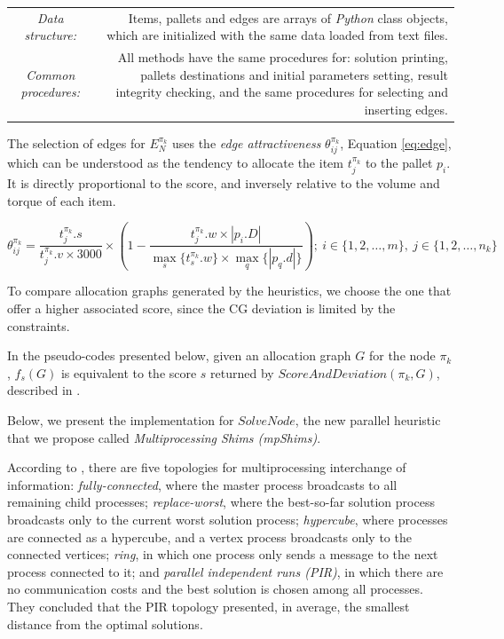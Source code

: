 \documentclass[preprint,authoryear]{elsarticle}
\begin{document}
\bgroup
\def\arraystretch{1.2}
\begin{table}[H]
	\centering
	\small
	\begin{tabular}{CD}
		
		{\it Data structure:}     & Items, pallets and edges are arrays of \emph{Python} class objects, which are initialized with the same data loaded from text files. \\
				
		{\it Common procedures:}  & All methods have the same procedures for: solution printing, pallets destinations and initial parameters setting, result integrity checking, and the same procedures for selecting and inserting edges.\\

	\end{tabular}
	\normalsize
\end{table}
\egroup

The selection of edges for $E_N^{\pi_k}$\/ uses the {\it edge attractiveness}\/ $\theta^{\pi_k}_{ij}$, Equation \ref{eq:edge}, which can be understood as the tendency to allocate the item $t^{\pi_k}_j$\/ to the pallet $p_i$. It is directly proportional to the score, and inversely relative to the volume and torque of each item. 

\begin{equation} \label{eq:edge}
	\theta^{\pi_k}_{ij}= \frac{t^{\pi_k}_j.s}{t^{\pi_k}_j.v \times 3000}\times(1-\frac{t^{\pi_k}_j.w\times|p_i.D|}{\max_s\{t^{\pi_k}_s.w\}\times\max_q\{|p_q.d|\}});\ i \in \{1,2,\ldots,m\},\ j \in \{1,2,\ldots,n_k\}
\end{equation} 

To compare allocation graphs generated by the heuristics, we choose the one that offer a higher associated score, since the CG deviation is limited by the constraints.

In the pseudo-codes presented below, given an allocation graph $G$\/ for the node $\pi_k$, $f_s(G)$\/ is equivalent to the score $s$\/ returned by $ScoreAndDeviation({\pi_k},G) $, described in \cite{MesquitaSanches2023}.

Below, we present the implementation for $SolveNode$, the new parallel heuristic that we propose called {\it Multiprocessing Shims (mpShims)}.

According to \cite[p.226]{manfrin2006}, there are five topologies for multiprocessing interchange of information: {\it fully-connected}, where the master process broadcasts to all remaining child processes; {\it replace-worst}, where the best-so-far solution process broadcasts only to the current worst solution process; {\it hypercube}, where processes are connected as a hypercube, and a vertex process broadcasts only to the connected vertices; {\it ring}, in which one process only sends a message to the next process connected to it; and {\it parallel independent runs (PIR)}, in which there are no communication costs and the best solution is chosen among all processes. They concluded that the PIR topology presented, in average, the smallest distance from the optimal solutions.
\end{document}
